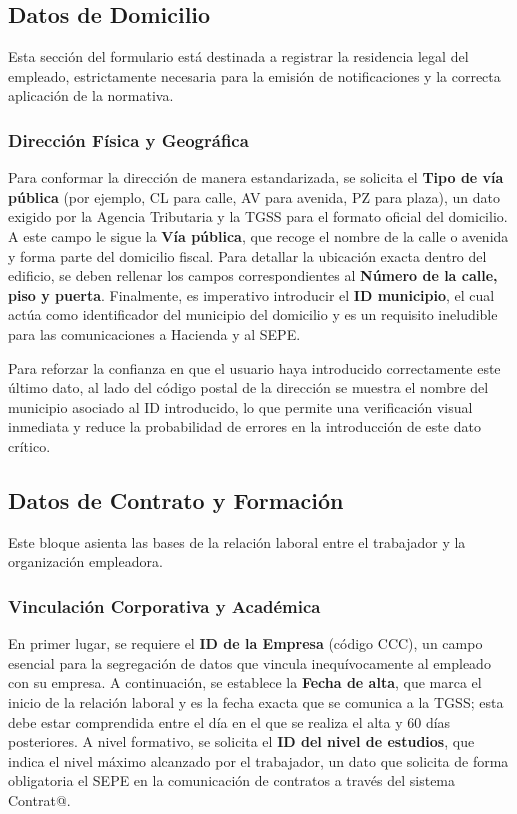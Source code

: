 \subsection{Datos de Domicilio}

Esta sección del formulario está destinada a registrar la residencia legal del empleado, estrictamente necesaria para la emisión de notificaciones y la correcta aplicación de la normativa.

\subsubsection{Dirección Física y Geográfica} Para conformar la dirección de manera estandarizada, se solicita el \textbf{Tipo de vía pública} (por ejemplo, CL para calle, AV para avenida, PZ para plaza), un dato exigido por la Agencia Tributaria y la TGSS para el formato oficial del domicilio. A este campo le sigue la \textbf{Vía pública}, que recoge el nombre de la calle o avenida y forma parte del domicilio fiscal. Para detallar la ubicación exacta dentro del edificio, se deben rellenar los campos correspondientes al \textbf{Número de la calle, piso y puerta}. Finalmente, es imperativo introducir el \textbf{ID municipio}, el cual actúa como identificador del municipio del domicilio y es un requisito ineludible para las comunicaciones a Hacienda y al SEPE.

Para reforzar la confianza en que el usuario haya introducido correctamente este último dato, al lado del código postal de la dirección se muestra el nombre del municipio asociado al ID introducido, lo que permite una verificación visual inmediata y reduce la probabilidad de errores en la introducción de este dato crítico.

\subsection{Datos de Contrato y Formación}

Este bloque asienta las bases de la relación laboral entre el trabajador y la organización empleadora.

\subsubsection{Vinculación Corporativa y Académica} En primer lugar, se requiere el \textbf{ID de la Empresa} (código CCC), un campo esencial para la segregación de datos que vincula inequívocamente al empleado con su empresa. A continuación, se establece la \textbf{Fecha de alta}, que marca el inicio de la relación laboral y es la fecha exacta que se comunica a la TGSS; esta debe estar comprendida entre el día en el que se realiza el alta y 60 días posteriores. A nivel formativo, se solicita el \textbf{ID del nivel de estudios}, que indica el nivel máximo alcanzado por el trabajador, un dato que solicita de forma obligatoria el SEPE en la comunicación de contratos a través del sistema Contrat@.

